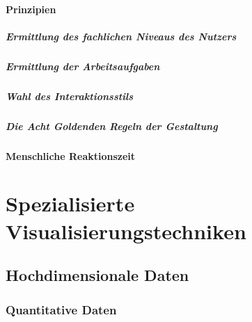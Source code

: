             \subsubsection{Prinzipien} %

                \paragraph{Ermittlung des fachlichen Niveaus des Nutzers} %

                \paragraph{Ermittlung der Arbeitsaufgaben} %

                \paragraph{Wahl des Interaktionsstils} %

                \paragraph{Die Acht Goldenden Regeln der Gestaltung} %

            \subsubsection{Menschliche Reaktionszeit} %

\chapter{Spezialisierte Visualisierungstechniken} %

    \section{Hochdimensionale Daten} %

        \subsection{Quantitative Daten} %

